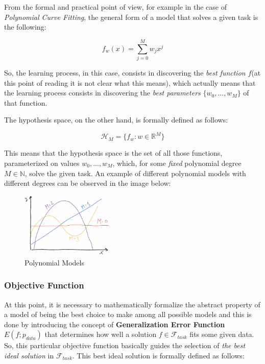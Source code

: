 \newpage

From the formal and practical point of view, for example in the case of
\emph{Polynomial Curve Fitting}, the general form of a model that solves a given
task is the following:

\begin{equation*}
      f_w(x) = \sum_{j = 0}^{M} w_jx^j
\end{equation*}

So, the learning process, in this case, consists in discovering the
\emph{best function} $f$(at this point of reading it is not clear what this means),
which actually means that the learning process consists in discovering the
\emph{best parameters} $\{w_0,...,w_M\}$ of that function.

The hypothesis space, on the other hand, is formally defined as follows:

\begin{equation*}
      \mathcal{H}_M = \{f_w : w \in \mathbb{R}^M\}
\end{equation*}

This means that the hypothesis space is the set of all those functions, parameterized on
values $w_0,...,w_M$, which, for some \emph{fixed} polynomial degree $M \in \mathbb{N}$,
solve the given task. An example of different polynomial models with different degrees
can be observed in the image below:

\begin{figure}[h]
      \centering
      \includegraphics[width=0.4\textwidth]{../img/Polynomial_models}
      \caption{Polynomial Models}
\end{figure}

\subsubsection{Objective Function}

At this point, it is necessary to mathematically formalize the abstract property of
a model of being the best choice to make among all possible models and this is
done by introducing the concept of \textbf{Generalization Error Function} $E(f; p_{data})$
that determines how well a solution $f \in \mathcal{F}_{task}$ fits some given data.
So, this particular objective function basically guides the selection of
\emph{the best ideal solution} in $\mathcal{F}_{task}$. This best ideal solution is
formally defined as follows:

